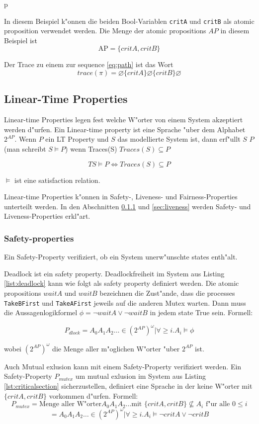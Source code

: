 p\documentclass[a4paper, twoside]{article}
\begin{document}
In diesem Beispiel k"onnen die beiden Bool-Variablen \verb|critA| und \verb|critB| als atomic proposition verwendet werden. Die Menge der atomic propositions $AP$ in diesem Beispiel ist
\[
\text{AP}=\{critA, critB\}
\]

Der Trace zu einem zur sequence \ref{eq:path} ist das Wort
\[
trace(\pi) = \varnothing \{critA\} \varnothing \{critB\} \varnothing
\]

\subsection{Linear-Time Properties}
\label{sec:satisfactionrelations}

Linear-time Properties legen fest welche W"orter von einem System akzeptiert werden d"urfen. Ein Linear-time property ist eine Sprache "uber dem Alphabet $2^{AP}$.
Wenn $P$ ein LT Property und $S$ das modellierte System ist, dann erf"ullt $S$ $P$ (man schreibt $S \models P$) wenn Traces(S) $ Traces(S) \subseteq P $

\[
TS \models P \iff Traces(S) \subseteq P 
\]

$ \models $ ist eine satisfaction relation. 

Linear-time Properties k"onnen in Safety-, Liveness- und Fairness-Properties unterteilt werden. In den Abschnitten \ref{sec:safety} und \ref{sec:liveness} werden Safety- und Liveness-Properties erkl"art.

\subsubsection{Safety-properties}
\label{sec:safety}

Ein Safety-Property verifiziert, ob ein System unerw"unschte states enth"alt. 

Deadlock ist ein safety property. Deadlockfreiheit im System aus Listing \ref{list:deadlock} kann wie folgt als safety property definiert werden. Die atomic propositions $waitA$ und $waitB$ bezeichnen die Zust"ande, dass die processes \verb|TakeBFirst| und \verb|TakeAFirst| jeweils auf die anderen Mutex warten. Dann muss die Aussagenlogikformel  $\phi=\neg waitA \lor \neg waitB$ in jedem state True sein. Formell:

\[
P_{dlock} = {A_0 A_1 A_2 \dots \in (2^{AP})^{\omega} | \forall \geq i.   A_i \models \phi}
\]

wobei $(2^{AP})^{\omega}$ die Menge aller m"oglichen W"orter "uber $2^{AP}$ ist.

Auch Mutual exlusion kann mit einem Safety-Property verifiziert werden. Ein Safety-Property $P_{mutex}$ um mutual exlusion im System aus Listing \ref{lst:criticalsection} sicherzustellen, definiert eine Sprache in der keine W"orter mit $\{critA,critB\}$ vorkommen d"urfen. Formell:
\[
P_{mutex} = \text{Menge aller W"orter} A_0 A_1 A_2 \dots \text{mit } \{critA,critB\} \not \subseteq A_i \text{ f"ur alle } 0 \leq i
\]
\[
 = {A_0 A_1 A_2 \dots \in (2^{AP})^{\omega} | \forall \geq i.   A_i \models \neg critA \lor \neg critB}
\]
\end{document}
